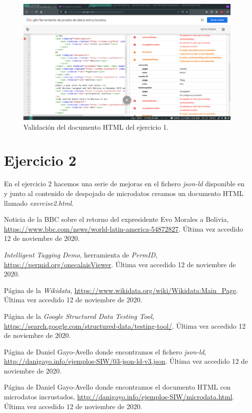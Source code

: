 \documentclass[11pt]{article}
\begin{document}
\begin{figure}[h]
\caption{Validación del documento HTML del ejercicio 1.}
\centering
\includegraphics[width=\textwidth]{validacion-ex1}
\end{figure}

\section{Ejercicio 2}
En el ejercicio 2 hacemos una serie de mejoras en el fichero \textit{json-ld} disponible en \cite{jsonv3} y junto al contenido de \cite{microdata} despojado de microdatos creamos un documento HTML llamado \textit{exercise2.html}.
\begin{thebibliography}{8}
Noticia de la BBC sobre el retorno del expresidente Evo Morales a Bolivia, \url{https://www.bbc.com/news/world-latin-america-54872827}. Última vez accedido 12 de noviembre de 2020.

\textit{Intelligent Tagging Demo}, herramienta de \textit{PermID}, \url{https://permid.org/onecalaisViewer}. Última vez accedido 12 de noviembre de 2020.

Página de la \textit{Wikidata}, \url{https://www.wikidata.org/wiki/Wikidata:Main_Page}. Última vez accedido 12 de noviembre de 2020.

Página de la \textit{Google Structured Data Testing Tool}, \url{https://search.google.com/structured-data/testing-tool/}. Última vez accedido 12 de noviembre de 2020.

Página de Daniel Gayo-Avello donde encontramos el fichero \textit{json-ld}, \url{http://danigayo.info/ejemplos-SIW/03-json-ld-v3.json}. Última vez accedido 12 de noviembre de 2020.

Página de Daniel Gayo-Avello donde encontramos el documento HTML con microdatos incrustados, \url{http://danigayo.info/ejemplos-SIW/microdata.html}. Última vez accedido 12 de noviembre de 2020.
\end{thebibliography}
\end{document}
